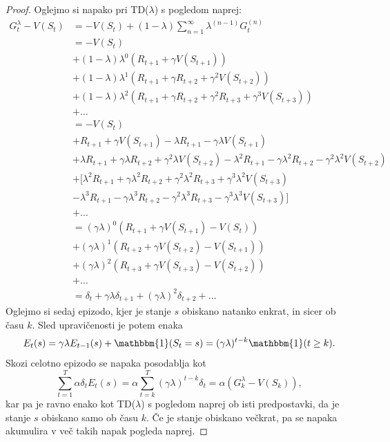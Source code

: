 \documentclass[12pt,a4paper]{amsart}
\theoremstyle{definition} %
\theoremstyle{plain} %
\begin{document}
\begin{proof} 
    Oglejmo si napako pri TD($\lambda$) s pogledom naprej:
    \begin{align*}
    G_t^\lambda - V(S_t) &= - V(S_t)  + (1 - \lambda) \sum_{n=1}^\infty \lambda^{(n-1)} G_t^{(n)} \\
                         &= - V(S_t) \\
                         &+ (1 - \lambda) \lambda^0 (R_{t+1} + \gamma V(S_{t+1})) \\
                         &+ (1 - \lambda) \lambda^1 (R_{t+1} + \gamma R_{t+2} + \gamma^2 V(S_{t+2})) \\
                         &+ (1 - \lambda) \lambda^2 (R_{t+1} + \gamma R_{t+2} + \gamma^2 R_{t+3} + \gamma^3 V(S_{t+3})) \\
                         &+ \dots \\
                         &= - V(S_t) \\
                         &+ R_{t+1} + \gamma V(S_{t+1}) - \lambda R_{t+1} - \gamma \lambda V(S_{t+1}) \\
                         &+ \lambda R_{t+1} + \gamma \lambda R_{t+2} + \gamma^2 \lambda V(S_{t+2}) - 
                                \lambda^2 R_{t+1} - \gamma \lambda^2 R_{t+2} - \gamma^2 \lambda^2 V(S_{t+2}) \\
                         &+ [\lambda^2 R_{t+1} + \gamma \lambda^2 R_{t+2} + \gamma^2 \lambda^2 R_{t+3} + \gamma^3 \lambda^2 V(S_{t+3}) \\
                         &- \lambda^3 R_{t+1} - \gamma \lambda^3 R_{t+2} - \gamma^2 \lambda^3 R_{t+3} - \gamma^3 \lambda^3 V(S_{t+3})] \\
                         &+ \dots \\
                         &= (\gamma \lambda)^0 (R_{t+1} + \gamma V(S_{t+1}) - V(S_t)) \\
                         &+ (\gamma \lambda)^1 (R_{t+2} + \gamma V(S_{t+2}) - V(S_{t+1})) \\
                         &+ (\gamma \lambda)^2 (R_{t+3} + \gamma V(S_{t+3}) - V(S_{t+2})) \\
                         &+ \dots \\
                         &= \delta_t + \gamma \lambda \delta_{t+1} + (\gamma \lambda)^2 \delta_{t+2} + \dots
    \end{align*}
    Oglejmo si sedaj epizodo, kjer je stanje $s$ obiskano natanko enkrat, in sicer ob času $k$. 
    Sled upravičenosti je potem enaka 
    $$
    E_t(s) = \gamma \lambda E_{t-1}(s) + \mathbbm{1}(S_t = s) = (\gamma \lambda)^{t-k} 
    \mathbbm{1}(t \geq k).
    $$
    Skozi celotno epizodo se napaka posodablja kot 
    $$
    \sum_{t=1}^T \alpha \delta_t E_t(s) = \alpha \sum_{t=k}^T (\gamma \lambda)^{t-k} \delta_t =
    \alpha (G_k^\lambda - V(S_k)),
    $$
    kar pa je ravno enako kot TD($\lambda$) s pogledom naprej ob isti predpostavki, da je stanje $s$ obiskano 
    samo ob času $k$. Če je stanje obiskano večkrat, pa se napaka akumulira v več takih napak pogleda naprej.
\end{proof}
\end{document}
